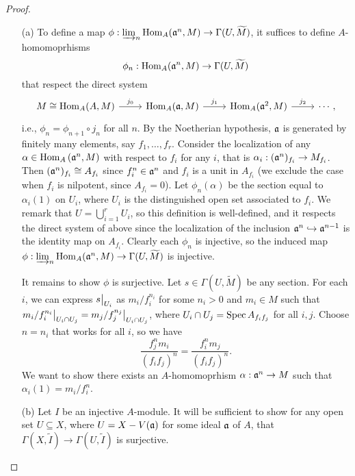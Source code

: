 \documentclass{article}
\begin{document}
\begin{enumerate} [label=\textbf{\arabic*.}, leftmargin=0em]
\begin{proof} $ $ \vspace{0pt}
\begin{itemize} [leftmargin=0cm]
\item[(a)] To define a map $\phi : \varinjlim_n \operatorname{Hom}_A(\mathfrak{a}^n, M) \to \Gamma(U, \widetilde{M})$, it suffices to define $A$-homomoprhisms $$\phi_n : \operatorname{Hom}_A(\mathfrak{a}^n, M) \to \Gamma(U, \widetilde{M})$$ that respect the direct system
\[ \begin{tikzcd}
  {M \cong \Hom_A(A, M)} \arrow[r, "j_0"] & {\Hom_A(\goth{a}, M)} \arrow[r, "j_1"] & {\Hom_A(\goth{a}^2, M)} \arrow[r, "j_2"] & \cdots,
  \end{tikzcd} \]
i.e., $\phi_n = \phi_{n + 1} \circ j_n$ for all $n$.
By the Noetherian hypothesis, $\mathfrak{a}$ is generated by finitely many elements, say $f_1, \dots, f_r$.
Consider the localization of any $\alpha \in \operatorname{Hom}_A{(\mathfrak{a}^n, M)}$ with respect to $f_i$ for any $i$, that is $\alpha_i : (\mathfrak{a}^n)_{f_i}\to M_{f_i}$.
Then $(\mathfrak{a}^n)_{f_i} \cong A_{f_i}$ since $f_i^n \in \mathfrak{a}^n$ and $f_i$ is a unit in $A_{f_i}$ (we exclude the case when $f_i$ is nilpotent, since $A_{f_i} = 0$).
Let $\phi_n(\alpha)$ be the section equal to $\alpha_i(1)$ on $U_i$, where $U_i$ is the distinguished open set associated to $f_i$.
We remark that $U = \bigcup_{i = 1}^r U_i$, so this definition is well-defined, and it respects the direct system of above since the localization of the inclusion $\mathfrak{a}^{n} \hookrightarrow \mathfrak{a}^{n - 1}$ is the identity map on $A_{f_i}$.
Clearly each $\phi_n$ is injective, so the induced map $\phi : \varinjlim_n \operatorname{Hom}_A(\mathfrak{a}^n, M) \to \Gamma(U, \widetilde{M})$ is injective.

It remains to show $\phi$ is surjective.
Let $s \in \Gamma(U, \widetilde{M})$ be any section.
For each $i$, we can express $\restr{s}{U_i}$ as $m_i/f_i^{n_i}$ for some $n_i > 0$ and $m_i \in M$ such that $\restr{m_i/f_i^{n_i}}{U_i \cap U_j} = \restr{m_j/f_j^{n_j}}{U_i \cap U_j}$, where $U_i \cap U_j = \operatorname{Spec}{A_{f_if_j}}$ for all $i, j$.
Choose $n = n_i$ that works for all $i$, so we have
\begin{equation*}
  \frac{f_j^n m_i}{(f_if_j)^n} = \frac{f_i^n m_j}{(f_if_j)^n}.
\end{equation*}
We want to show there exists an $A$-homomoprhism $\alpha : \mathfrak{a}^n \to M$ such that $\alpha_i(1) = m_i / f_i^n$.

\item[(b)] Let $I$ be an injective $A$-module.
It will be sufficient to show for any open set $U \subseteq X$, where $U = X - V(\mathfrak{a})$ for some ideal $\mathfrak{a}$ of $A$, that $\Gamma(X, \tilde{I}) \to \Gamma(U, \tilde{I})$ is surjective.
\end{itemize} 
\end{proof}

\end{enumerate}
\end{document}
